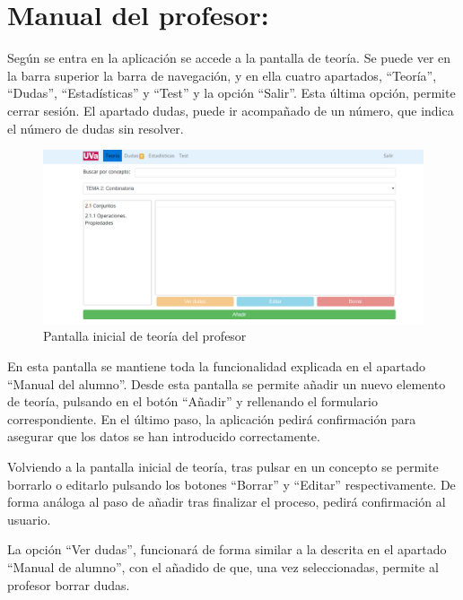 \documentclass[openright,twoside,10pt]{book}
\begin{document}
    \section{Manual del profesor:}\label{manual-del-profesor}
    
    Según se entra en la aplicación se accede a la pantalla de teoría. Se
    puede ver en la barra superior la barra de navegación, y en ella cuatro
    apartados, \enquote{Teoría}, \enquote{Dudas}, \enquote{Estadísticas} y
    \enquote{Test} y la opción \enquote{Salir}. Esta última opción, permite
    cerrar sesión. El apartado dudas, puede ir acompañado de un número, que
    indica el número de dudas sin resolver.
    
    \begin{figure}[H]
        \begin{center}
            \includegraphics[width=\textwidth]{img/manual/profesor-teoria.png}
        \end{center}
        \caption{Pantalla inicial de teoría del profesor}
    \end{figure}
    
    En esta pantalla se mantiene toda la funcionalidad explicada en el
    apartado \enquote{Manual del alumno}. Desde esta pantalla se permite
    añadir un nuevo elemento de teoría, pulsando en el botón
    \enquote{Añadir} y rellenando el formulario correspondiente. En el
    último paso, la aplicación pedirá confirmación para asegurar que los
    datos se han introducido correctamente.
    
    Volviendo a la pantalla inicial de teoría, tras pulsar en un concepto se
    permite borrarlo o editarlo pulsando los botones \enquote{Borrar} y
    \enquote{Editar} respectivamente. De forma análoga al paso de añadir
    tras finalizar el proceso, pedirá confirmación al usuario.
    
    La opción \enquote{Ver dudas}, funcionará de forma similar a la descrita
    en el apartado \enquote{Manual de alumno}, con el añadido de que, una
    vez seleccionadas, permite al profesor borrar dudas.
    
\end{document}
